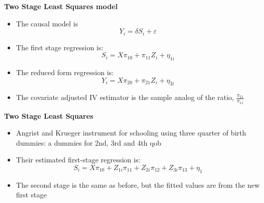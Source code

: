 \documentclass[notes=show]{beamer}
\begin{document}
\begin{frame}[plain]

	\begin{center}
	\textbf{Two Stage Least Squares model}
	\end{center}
	
	\begin{itemize}
	\item The causal model is $$Y_i = \delta S_i + \varepsilon$$
	\item The first stage regression is:$$S_i=X\pi_{10} + \pi_{11}Z_i + \eta_{1i}$$
	\item The reduced form regression is:$$Y_i=X\pi_{20} + \pi_{21}Z_i+\eta_{2i}$$
	\item The covariate adjusted IV estimator is the sample analog of the ratio, $\frac{\pi_{21}}{\pi_{11}}$
	\end{itemize}

\end{frame}

\begin{frame}[plain]

	\begin{center}
	\textbf{Two Stage Least Squares}
	\end{center}
	
	\begin{itemize}
	\item Angrist and Krueger instrument for schooling using three quarter of birth dummies:  a dummies for 2nd, 3rd and 4th qob
	\item Their estimated first-stage regression is:$$S_i=X\pi_{10} + Z_{1i}\pi_{11} + Z_{2i}\pi_{12} + Z_{3i}\pi_{13}+\eta_1$$
	\item The second stage is the same as before, but the fitted values are from the new first stage
	\end{itemize}

\end{frame}
\end{document}
